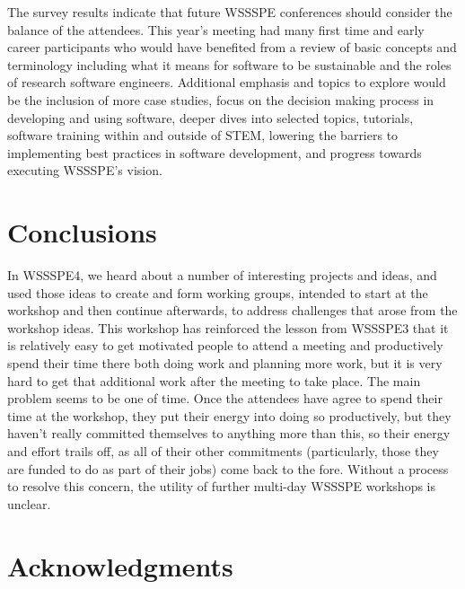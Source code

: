 \documentclass[11pt, oneside]{amsart}
\newcommand{\todo}[1]{{\color{blue}$\blacksquare$~\textsf{[TODO: #1]}}}
\begin{document}
The survey results indicate that future WSSSPE conferences should consider the balance of the attendees.
This year's meeting had many first time and early career participants who would have benefited from a review of basic concepts and terminology including what it means for software to be sustainable and the roles of research software engineers.
Additional emphasis and topics to explore would be the inclusion of more case studies, focus on the decision making process in developing and using software, deeper dives into selected topics, tutorials, software training within and outside of STEM, lowering the barriers to implementing best practices in software development, and progress towards executing WSSSPE's vision.

\section{Conclusions} \label{sec:conclusions}

In WSSSPE4, we heard about a number of interesting projects and ideas, and used those
ideas to create and form working groups, intended to start at the workshop and then
continue afterwards, to address challenges that arose from the workshop ideas.  This workshop
has reinforced the lesson from WSSSPE3 that it is relatively easy to get motivated people
to attend a meeting and productively spend their time there both doing work and planning
more work, but it is very hard to get that additional work after the meeting to take place.
The main problem seems to be one of time.  Once the attendees have agree to spend
their time at the workshop, they put their energy into doing so productively, but they haven't
really committed themselves to anything more than this, so their energy and effort trails
off, as all of their other commitments (particularly, those they are funded to do as part of
their jobs) come back to the fore. Without a process to resolve this concern, the utility of
further multi-day WSSSPE workshops is unclear.



\section*{Acknowledgments} \label{sec:acks}
\end{document}
